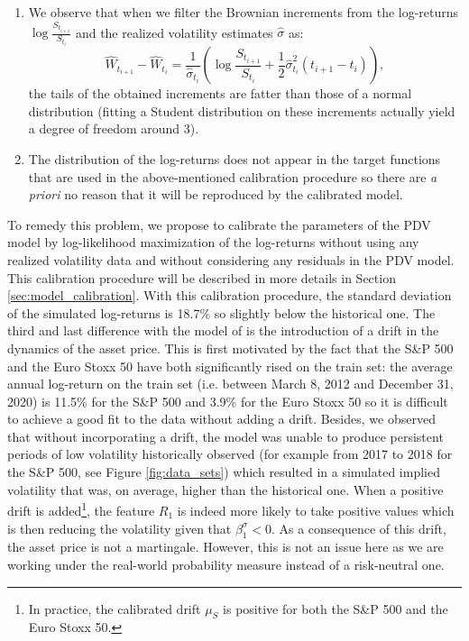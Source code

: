 \begin{enumerate}
    \item We observe that when we filter the Brownian increments from the log-returns $\log \frac{S_{t_{i+1}}}{S_{t_i}}$ and the realized volatility estimates $\hat{\sigma}$ as:
    \begin{equation*}
        \hat{W}_{t_{i+1}}-\hat{W}_{t_i} =\frac{1}{\hat{\sigma}_{t_i}} \left( \log \frac{S_{t_{i+1}}}{S_{t_i}}+ \frac{1}{2}\hat{\sigma}_{t_i}^2(t_{i+1}-t_i) \right),
    \end{equation*}
    the tails of the obtained increments are fatter than those of a normal distribution (fitting a Student distribution on these increments actually yield a degree of freedom around 3). 
    \item The distribution of the log-returns does not appear in the target functions that are used in the above-mentioned calibration procedure so there are \textit{a priori} no reason that it will be reproduced by the calibrated model. 
\end{enumerate}
To remedy this problem, we propose to calibrate the parameters of the PDV model by log-likelihood maximization of the log-returns without using any realized volatility data and without considering any residuals in the PDV model. This calibration procedure will be described in more details in Section \ref{sec:model_calibration}. With this calibration procedure, the standard deviation of the simulated log-returns is 18.7\% so slightly below the historical one. The third and last difference with the model of \cite{guyon2022volatility} is the introduction of a drift in the dynamics of the asset price. This is first motivated by the fact that the S\&P 500 and the Euro Stoxx 50 have both significantly rised on the train set: the average annual log-return on the train set (i.e. between March 8, 2012 and December 31, 2020) is 11.5\% for the S\&P 500 and 3.9\% for the Euro Stoxx 50 so it is difficult to achieve a good fit to the data without adding a drift. Besides, we observed that without incorporating a drift, the model was unable to produce persistent periods of low volatility historically observed (for example from 2017 to 2018 for the S\&P 500, see Figure \ref{fig:data_sets}) which resulted in a simulated implied volatility that was, on average, higher than the historical one. When a positive drift is added\footnote{In practice, the calibrated drift $\mu_S$ is positive for both the S\&P 500 and the Euro Stoxx 50.}, the feature $R_1$ is indeed more likely to take positive values which is then reducing the volatility given that $\beta_1^{\sigma}<0$. As a consequence of this drift, the asset price is not a martingale. However, this is not an issue here as we are working under the real-world probability measure instead of a risk-neutral one. 

